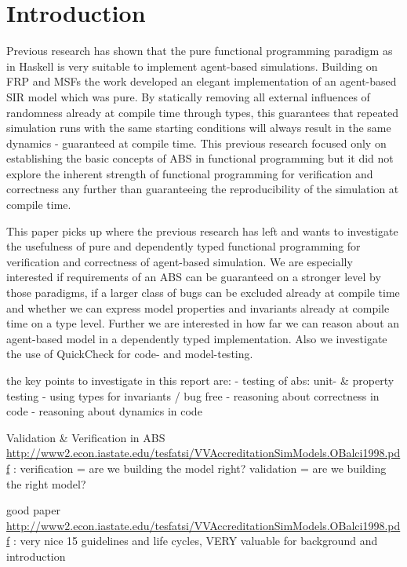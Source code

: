 \section{Introduction}
Previous research has shown that the pure functional programming paradigm as in Haskell is very suitable to implement agent-based simulations. Building on FRP and MSFs the work developed an elegant implementation of an agent-based SIR model which was pure. By statically removing all external influences of randomness already at compile time through types, this guarantees that repeated simulation runs with the same starting conditions will always result in the same dynamics - guaranteed at compile time. This previous research focused only on establishing the basic concepts of ABS in functional programming but it did not explore the inherent strength of functional programming for verification and correctness any further than guaranteeing the reproducibility of the simulation at compile time.

This paper picks up where the previous research has left and wants to investigate the usefulness of pure and dependently typed functional programming for verification and correctness of agent-based simulation. We are especially interested if requirements of an ABS can be guaranteed on a stronger level by those paradigms, if a larger class of bugs can be excluded already at compile time and whether we can express model properties and invariants already at compile time on a type level. Further we are interested in how far we can reason about an agent-based model in a dependently typed implementation. Also we investigate the use of QuickCheck for code- and model-testing.


the key points to investigate in this report are:
- testing of abs: unit- \& property testing
- using types for invariants / bug free
- reasoning about correctness in code
- reasoning about dynamics in code


Validation \& Verification in ABS
\url{http://www2.econ.iastate.edu/tesfatsi/VVAccreditationSimModels.OBalci1998.pdf} : verification = are we building the model right? validation = are we building the right model?

good paper \url{http://www2.econ.iastate.edu/tesfatsi/VVAccreditationSimModels.OBalci1998.pdf} : very nice 15 guidelines and life cycles, VERY valuable for background and introduction

